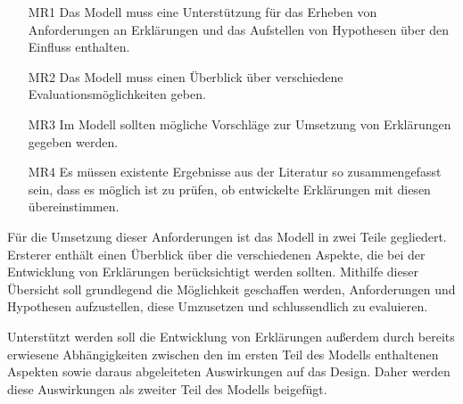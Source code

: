 \begin{enumerate}
    \item[MR1] Das Modell muss eine Unterstützung für das Erheben von Anforderungen an Erklärungen und das Aufstellen von Hypothesen über den Einfluss enthalten.
    \item[MR2] Das Modell muss einen Überblick über verschiedene Evaluationsmöglichkeiten geben.
    \item[MR3] Im Modell sollten mögliche Vorschläge zur Umsetzung von Erklärungen gegeben werden.
    \item[MR4] Es müssen existente Ergebnisse aus der Literatur so zusammengefasst sein, dass es möglich ist zu prüfen, ob entwickelte Erklärungen mit diesen übereinstimmen.
\end{enumerate}

Für die Umsetzung dieser Anforderungen ist das Modell in zwei Teile gegliedert. Ersterer enthält einen Überblick über die verschiedenen Aspekte, die bei der Entwicklung von Erklärungen berücksichtigt werden sollten. Mithilfe dieser Übersicht soll grundlegend die Möglichkeit geschaffen werden, Anforderungen und Hypothesen aufzustellen, diese Umzusetzen und schlussendlich zu evaluieren.

Unterstützt werden soll die Entwicklung von Erklärungen außerdem durch bereits erwiesene Abhängigkeiten zwischen den im ersten Teil des Modells enthaltenen Aspekten sowie daraus abgeleiteten Auswirkungen auf das Design. Daher werden diese Auswirkungen als zweiter Teil des Modells beigefügt.

